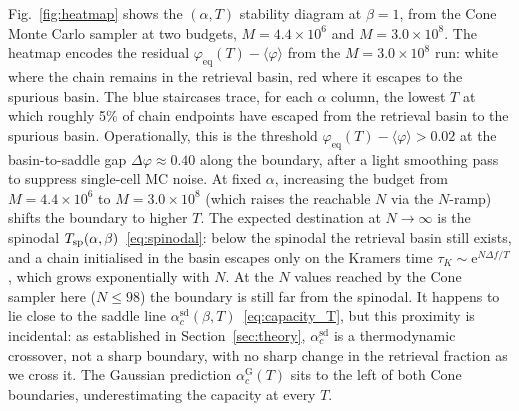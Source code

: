 \documentclass[letterpaper]{article} %
\newcommand{\e}{{\mathrm{e}}}
\newcommand{\Bnet}{\beta}
\newcommand{\acGauss}{\alpha_c^{\mathrm{G}}}
\newcommand{\acSd}{\alpha_c^{\mathrm{sd}}}
\begin{document}
Fig.~\ref{fig:heatmap} shows the $(\alpha, T)$ stability diagram at
$\Bnet = 1$, from the Cone Monte Carlo sampler at two budgets,
$M = 4.4 \times 10^6$ and $M = 3.0 \times 10^8$. The heatmap encodes the
residual $\varphi_{\mathrm{eq}}(T) - \langle\varphi\rangle$ from the
$M = 3.0 \times 10^8$ run: white where the chain remains in the retrieval
basin, red where it escapes to the spurious basin. The blue staircases trace,
for each $\alpha$ column, the lowest $T$ at which roughly 5\% of chain
endpoints have escaped from the retrieval basin to the spurious basin.
Operationally, this is the threshold
$\varphi_{\mathrm{eq}}(T) - \langle\varphi\rangle > 0.02$ at the
basin-to-saddle gap $\Delta\varphi \approx 0.40$ along the boundary, after
a light smoothing pass to suppress single-cell MC noise. At fixed $\alpha$, 
increasing the budget from $M = 4.4 \times 10^6$ to
$M = 3.0 \times 10^8$ (which raises the reachable $N$ via the $N$-ramp)
shifts the boundary to higher $T$. The expected destination at
$N \to \infty$ is the spinodal $T_{\rm sp}(\alpha, \Bnet)$~\eqref{eq:spinodal}:
below the spinodal the retrieval basin still exists, and a chain initialised
in the basin escapes only on the Kramers time
$\tau_K \sim \e^{N \Delta f / T}$, which grows exponentially with $N$.  At
the $N$ values reached by the Cone sampler here ($N \le 98$) the boundary
is still far from the spinodal.  It happens to lie close to the saddle
line $\acSd(\Bnet, T)$~\eqref{eq:capacity_T}, but this proximity is
incidental: as established in Section~\ref{sec:theory}, $\acSd$ is a
thermodynamic crossover, not a sharp boundary, with no sharp change
in the retrieval fraction as we cross it.  The Gaussian prediction
$\acGauss(T)$ sits to the left of both Cone boundaries, underestimating
the capacity at every $T$.
\end{document}
